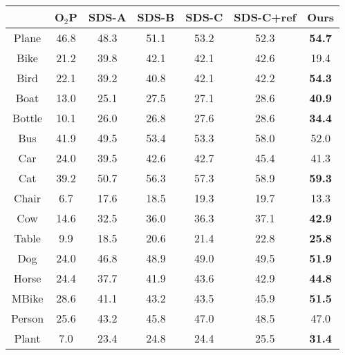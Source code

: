 \documentclass[10pt,twocolumn,letterpaper]{article}
\begin{document}
\begin{table*}[!htb]
\begin{center}
\begin{tabular}{|c|c|c|c|c|c|c|}         
\hline                               
       & O$_2$P & SDS-A & SDS-B & SDS-C & SDS-C+ref  & Ours\\   
\hline                               
Plane & 46.8 & 48.3 & 51.1 & 53.2 & 52.3 & \textbf{54.7} \\                                                  
Bike & 21.2 & 39.8 & 42.1 & 42.1 & 42.6 & 19.4 \\                                                   
Bird & 22.1 & 39.2 & 40.8 & 42.1 & 42.2 & \textbf{54.3} \\                                                   
Boat & 13.0 & 25.1 & 27.5 & 27.1 & 28.6 & \textbf{40.9} \\                                                   
Bottle & 10.1 & 26.0 & 26.8 & 27.6 & 28.6 & \textbf{34.4} \\                                                 
Bus & 41.9 & 49.5 & 53.4 & 53.3 & 58.0 & 52.0 \\                                                    
Car & 24.0 & 39.5 & 42.6 & 42.7 & 45.4 & 41.3 \\                                                    
Cat & 39.2 & 50.7 & 56.3 & 57.3 & 58.9 & \textbf{59.3} \\                                                    
Chair & 6.7 & 17.6 & 18.5 & 19.3 & 19.7 & 13.3 \\                                                   
Cow & 14.6 & 32.5 & 36.0 & 36.3 & 37.1 & \textbf{42.9} \\                                                    
Table & 9.9 & 18.5 & 20.6 & 21.4 & 22.8 & \textbf{25.8} \\                                                   
Dog & 24.0 & 46.8 & 48.9 & 49.0 & 49.5 & \textbf{51.9} \\                                                    
Horse & 24.4 & 37.7 & 41.9 & 43.6 & 42.9 & \textbf{44.8} \\                                                  
MBike & 28.6 & 41.1 & 43.2 & 43.5 & 45.9 & \textbf{51.5} \\                                                  
Person & 25.6 & 43.2 & 45.8 & 47.0 & 48.5 & 47.0 \\                                                 
Plant & 7.0 & 23.4 & 24.8 & 24.4 & 25.5 & \textbf{31.4} \\                                                   

\end{tabular}
\end{center}
\end{table*}
\end{document}
